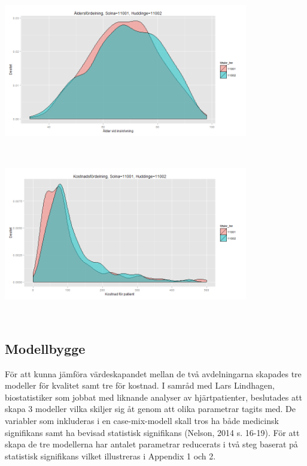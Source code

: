 \noindent\begin{minipage}{\textwidth}
\centering
\includegraphics[width=0.8\textwidth]{alder.png}
\label{fig:alder}            
\end{minipage}
\\

\noindent\begin{minipage}{\textwidth}
\centering
\includegraphics[width=0.8\textwidth]{kostnad.png}
\label{fig:kostnad}            
\end{minipage}
\\

\subsection{Modellbygge}

För att kunna jämföra värdeskapandet mellan de två avdelningarna skapades tre modeller för kvalitet samt tre för kostnad. I samråd med Lars Lindhagen, biostatistiker som jobbat med liknande analyser av hjärtpatienter, beslutades att skapa 3 modeller vilka skiljer sig åt genom att olika parametrar tagits med. De variabler som inkluderas i en case-mix-modell skall tros ha både medicinsk signifikans samt ha bevisad statistisk signifikans (Nelson, 2014 s. 16-19). För att skapa de tre modellerna har antalet parametrar reducerats i två steg baserat på statistisk signifikans vilket illustreras i Appendix 1 och 2.


